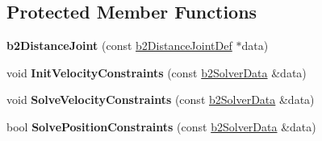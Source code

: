 \subsection*{Protected Member Functions}
\begin{DoxyCompactItemize}
\item 
\hypertarget{classb2_distance_joint_ad2bb6de92a47868629a7397e23256454}{{\bfseries b2\-Distance\-Joint} (const \hyperlink{structb2_distance_joint_def}{b2\-Distance\-Joint\-Def} $\ast$data)}\label{classb2_distance_joint_ad2bb6de92a47868629a7397e23256454}

\item 
\hypertarget{classb2_distance_joint_a2062ea8f1c89f8ccc3f053bbc7211b12}{void {\bfseries Init\-Velocity\-Constraints} (const \hyperlink{structb2_solver_data}{b2\-Solver\-Data} \&data)}\label{classb2_distance_joint_a2062ea8f1c89f8ccc3f053bbc7211b12}

\item 
\hypertarget{classb2_distance_joint_acbed5cd22ea4ccb44e4defe5f5aabe77}{void {\bfseries Solve\-Velocity\-Constraints} (const \hyperlink{structb2_solver_data}{b2\-Solver\-Data} \&data)}\label{classb2_distance_joint_acbed5cd22ea4ccb44e4defe5f5aabe77}

\item 
\hypertarget{classb2_distance_joint_a1e8b3a477067cf9273fb78fbec1a1556}{bool {\bfseries Solve\-Position\-Constraints} (const \hyperlink{structb2_solver_data}{b2\-Solver\-Data} \&data)}\label{classb2_distance_joint_a1e8b3a477067cf9273fb78fbec1a1556}

\end{DoxyCompactItemize}
